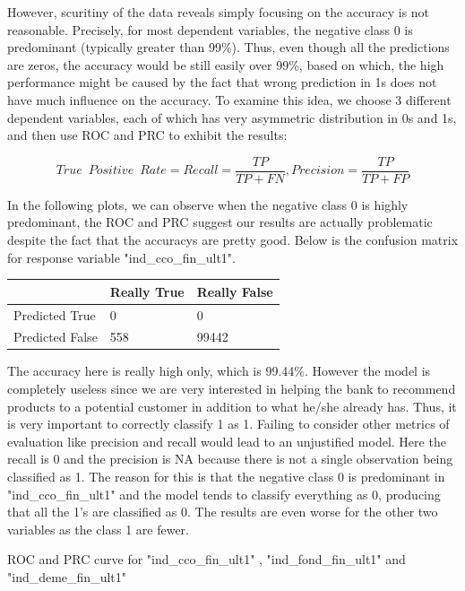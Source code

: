 \documentclass{article}
\begin{document}
\begin{spacing}{1}
\begin{large}
However, scuritiny of the data reveals simply focusing on the accuracy is not reasonable. Precisely, for most dependent variables, the negative class 0 is predominant (typically greater than 99\%). Thus, even though all the predictions are zeros, the accuracy would be still easily over 99\%, based on which, the high performance might be caused by the fact that wrong prediction in 1s does not have much influence on the accuracy. To examine this idea, we choose 3 different dependent variables, each of which has very asymmetric distribution in 0s and 1s, and then use ROC and PRC to exhibit the results:

$$True\enspace Positive\enspace Rate = Recall = \frac{TP}{TP+FN}, Precision = \frac{TP}{TP+FP}$$

In the following plots, we can observe when the negative class 0 is highly predominant, the ROC and PRC suggest our results are actually problematic despite the fact that the accuracys are pretty good. Below is the confusion matrix for response variable "ind\_cco\_fin\_ult1".

\vspace{5mm}
\begin{tabular}{| l | l | l |}
	\hline
	& Really True & Really False \\ \hline
	Predicted True & 0 & 0 \\ \hline
	Predicted False & 558 & 99442\\
	\hline
\end{tabular}
\vspace{5mm}

The accuracy here is really high only, which is 99.44\%. However the model is completely useless since we are very interested in helping the bank to recommend products to a potential customer in addition to what he/she already has. Thus, it is very important to correctly classify 1 as 1. Failing to consider other metrics of evaluation like precision and recall would lead to an unjustified model. Here the recall is 0 and the precision is NA because there is not a single observation being classified as 1. The reason for this is that the negative class 0 is predominant in "ind\_cco\_fin\_ult1" and the model tends to classify everything as 0, producing that all the 1’s are classified as 0. The results are even worse for the other two variables as the class 1 are fewer.

ROC and PRC curve for "ind\_cco\_fin\_ult1" , "ind\_fond\_fin\_ult1" and "ind\_deme\_fin\_ult1" 


\end{large}
\end{spacing}
\end{document}

